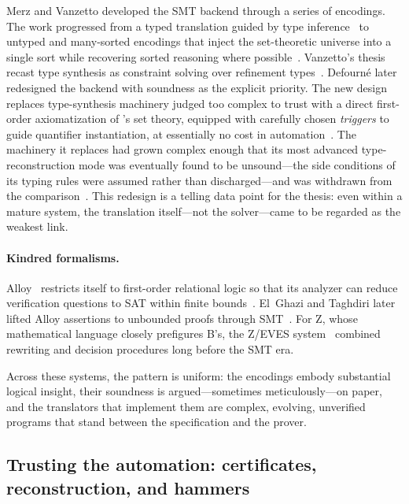 Merz and Vanzetto developed the SMT backend through a series of encodings. The
work progressed from a typed translation guided by type
inference~\cite{merz2012smt} to untyped and many-sorted encodings that inject the
set-theoretic universe into a single sort while recovering sorted reasoning
where possible~\cite{merz2018encoding}. Vanzetto's thesis recast type synthesis
as constraint solving over refinement types~\cite{vanzetto2014proof}. Defourn\'e
later redesigned the backend with soundness as the explicit priority. The new
design replaces type-synthesis machinery judged too complex to trust with a
direct first-order axiomatization of \tlaplus's set theory, equipped with
carefully chosen \emph{triggers} to guide quantifier instantiation, at
essentially no cost in automation~\cite{defourne2023encoding}. The machinery it
replaces had grown complex enough that its most advanced type-reconstruction
mode was eventually found to be unsound---the side conditions of its typing
rules were assumed rather than discharged---and was withdrawn from the
comparison~\cite{defourne2025encoding}. This redesign is
a telling data point for the thesis: even within a mature system, the
translation itself---not the solver---came to be regarded as the weakest link.

\paragraph*{Kindred formalisms.}
Alloy~\cite{jackson2012software} restricts itself to first-order relational
logic so that its analyzer can reduce verification questions to SAT within
finite bounds~\cite{torlak2007kodkod}. El~Ghazi and Taghdiri later lifted Alloy
assertions to unbounded proofs through SMT~\cite{elghazi2011relational}. For Z,
whose mathematical language closely prefigures B's, the Z/EVES
system~\cite{saaltink1997zeves} combined rewriting and decision procedures long
before the SMT era.

Across these systems, the pattern is uniform: the encodings embody substantial
logical insight, their soundness is argued---sometimes meticulously---on paper,
and the translators that implement them are complex, evolving, unverified
programs that stand between the specification and the prover.

\subsection{Trusting the automation: certificates, reconstruction, and hammers}
\label{subsec:rw-certificates}

